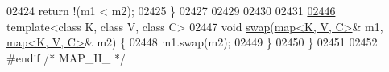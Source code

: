\begin{DoxyCode}
02424     \textcolor{keywordflow}{return} !(m1 < m2);
02425 \}
02427 
02429 
02430 
02431 
\hypertarget{map3_8h_source_l02446}{}\hyperlink{classaed2_1_1map_a119cb2938bbc11c25ebd4fb824782a72_a119cb2938bbc11c25ebd4fb824782a72}{02446} \textcolor{keyword}{template}<\textcolor{keyword}{class} K, \textcolor{keyword}{class} V, \textcolor{keyword}{class} C>
02447 \textcolor{keywordtype}{void} \hyperlink{namespaceaed2_ab24ac4be44835194ce27a61969e4a292_ab24ac4be44835194ce27a61969e4a292}{swap}(\hyperlink{classaed2_1_1map}{map<K, V, C>}& m1, \hyperlink{classaed2_1_1map}{map<K, V, C>}& m2) \{
02448     m1.swap(m2);
02449 \}
02450 \}
02451 
02452 \textcolor{preprocessor}{#endif }\textcolor{comment}{/* MAP\_H\_ */}
\end{DoxyCode}
